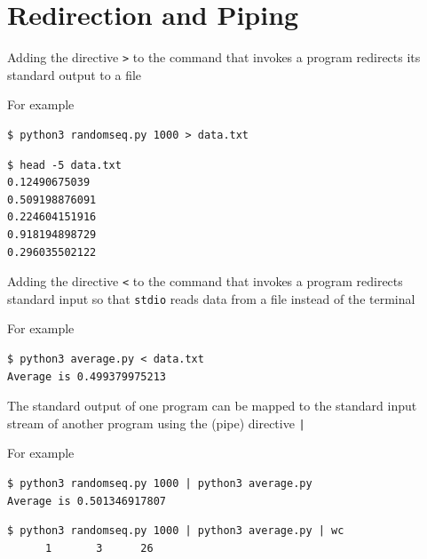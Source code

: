 \documentclass[8pt,a4paper,compress]{beamer}
\begin{document}
\section{Redirection and Piping}
\begin{frame}[fragile]
\pause

Adding the directive \lstinline{>} to the command that invokes a program redirects its standard output to a file

\pause\bigskip

For example

\smallskip

\begin{lstlisting}[language={},style=focusin]
$ python3 randomseq.py 1000 > data.txt
\end{lstlisting}

\pause\smallskip

\begin{lstlisting}[language={},style=focusin]
$ head -5 data.txt 
0.12490675039
0.509198876091
0.224604151916
0.918194898729
0.296035502122
\end{lstlisting}

\pause\bigskip

Adding the directive \lstinline{<} to the command that invokes a program redirects standard input so that \lstinline{stdio} reads data from a file instead of the terminal

\pause\bigskip

For example

\smallskip

\begin{lstlisting}[language={},style=focusin]
$ python3 average.py < data.txt
Average is 0.499379975213
\end{lstlisting}

\pause\bigskip

The standard output of one program can be mapped to the standard input stream of another program using the (pipe) directive \lstinline{|}

\pause\bigskip

For example

\smallskip

\begin{lstlisting}[language={},style=focusin]
$ python3 randomseq.py 1000 | python3 average.py 
Average is 0.501346917807
\end{lstlisting}

\pause\smallskip

\begin{lstlisting}[language={},style=focusin]
$ python3 randomseq.py 1000 | python3 average.py | wc
      1       3      26
\end{lstlisting}
\end{frame}
\end{document}
